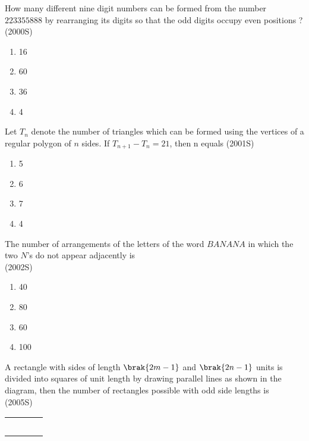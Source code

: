 \item How many different nine digit numbers can be formed from the number $223355888$ by rearranging its digits so that the odd digits occupy even positions ?\\
\hspace*{\fill}(2000S)\\
\begin{multicols}{2} 
\begin{enumerate}
\item16 \item 60\columnbreak\item 36\item 4
\end{enumerate}
\end{multicols}
\item Let $T_n$ denote the number of triangles which can be formed using the vertices of a regular polygon of $n$ sides. If $T_{n+1}-T_n=21$, then n equals
\hfill{(2001S)}\\
\begin{multicols}{2} 
\begin{enumerate}
\item 5\item 6\columnbreak\item  7\item  4
\end{enumerate}
\end{multicols}
\item The number of arrangements of the letters of the word $BANANA$ in which the two $N$'s do not appear adjacently is\\
\hspace*{\fill}(2002S)
\begin{multicols}{2} 
\begin{enumerate}
\item  40\item 80\columnbreak\item  60\item  100
\end{enumerate}
\end{multicols}
\item A rectangle with sides of length $\brak{2m-1}$ and $\brak{2n-1}$ units is divided into squares of unit length by drawing parallel lines as shown in the diagram, then the number of rectangles possible with odd side lengths is\\
\hspace*{\fill}(2005S)
\begin{center}
\begin{tabular}{|c|c|c|c|}
\hline
\quad&\quad&\quad&\quad\\
\hline
\quad&\quad&\quad&\quad\\
\hline
\quad&\quad&\quad&\quad\\
\hline\quad&\quad&\quad&\quad\\
\hline\quad&\quad&\quad&\quad\\
\hline\quad&\quad&\quad&\quad\\
\hline
\end{tabular}
\end{center}
